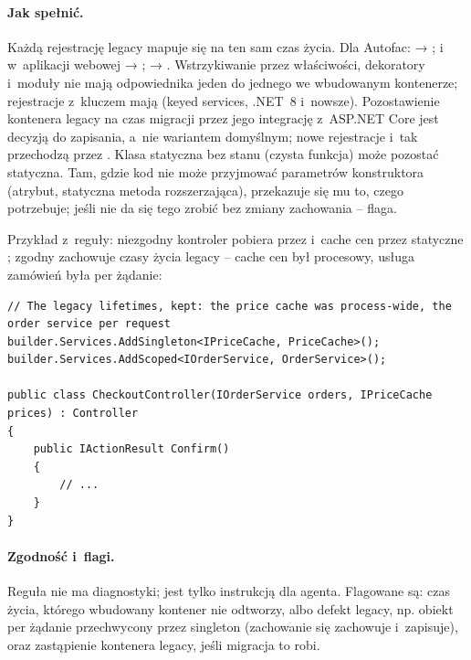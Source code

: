 \paragraph{Jak spełnić.} Każdą rejestrację legacy mapuje się na ten sam czas życia. Dla
Autofac:  → ;
 i~ w~aplikacji webowej →
;  → .
Wstrzykiwanie przez właściwości, dekoratory i~moduły nie mają odpowiednika jeden do jednego
we wbudowanym kontenerze; rejestracje z~kluczem mają (keyed services, .NET~8 i~nowsze).
Pozostawienie kontenera legacy na czas migracji przez jego integrację z~ASP.NET Core jest
decyzją do zapisania, a~nie wariantem domyślnym; nowe rejestracje i~tak przechodzą przez
. Klasa statyczna bez stanu (czysta funkcja) może pozostać
statyczna. Tam, gdzie kod nie może przyjmować parametrów konstruktora (atrybut, statyczna
metoda rozszerzająca), przekazuje się mu to, czego potrzebuje; jeśli nie da się tego zrobić
bez zmiany zachowania -- flaga.

Przykład z~reguły: niezgodny kontroler pobiera  przez
 i~cache cen przez statyczne
; zgodny zachowuje czasy życia legacy -- cache cen był
procesowy, usługa zamówień była per żądanie:

\begin{lstlisting}
// The legacy lifetimes, kept: the price cache was process-wide, the order service per request
builder.Services.AddSingleton<IPriceCache, PriceCache>();
builder.Services.AddScoped<IOrderService, OrderService>();

public class CheckoutController(IOrderService orders, IPriceCache prices) : Controller
{
    public IActionResult Confirm()
    {
        // ...
    }
}
\end{lstlisting}

\paragraph{Zgodność i~flagi.} Reguła nie ma diagnostyki; jest tylko instrukcją dla agenta.
Flagowane są: czas życia, którego wbudowany kontener nie odtworzy, albo defekt legacy, np.
obiekt per żądanie przechwycony przez singleton (zachowanie się zachowuje i~zapisuje), oraz
zastąpienie kontenera legacy, jeśli migracja to robi.


